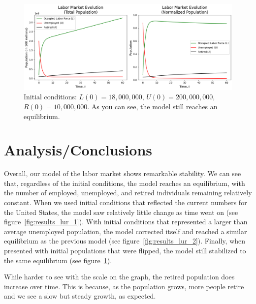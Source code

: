 \documentclass[11pt]{amsart}
\begin{document}
\begin{figure}[h]
    \centering
    \includegraphics[width=\textwidth]{figures/results_lur_3.png}
    \caption{Initial conditions: $L(0) = 18,000,000$, $U(0) = 200,000,000$, $R(0) = 10,000,000$. As you can see, the model still reaches an equilibrium.}
    \label{fig:results_lur_3}
\end{figure}



\section{Analysis/Conclusions}

Overall, our model of the labor market shows remarkable stability. 
We can see that, regardless of the initial conditions, the model reaches an equilibrium, 
with the number of employed, unemployed, and retired individuals remaining relatively constant.
When we used initial conditions that reflected the current numbers for the United States,
the model saw relatively little change as time went on (see figure~\ref{fig:results_lur_1}).
With initial conditions that represented a larger than average unemployed population, the model corrected itself and reached a
similar equilibrium as the previous model (see figure~\ref{fig:results_lur_2}).
Finally, when presented with initial populations that were flipped, the model still stabilized to the same equilibrium
(see figure~\ref{fig:results_lur_3}).

While harder to see with the scale on the graph, the retired population does increase over time. 
This is because, as the population grows, more people retire and we see a slow but steady growth, as expected.



\newpage 


\end{document}
